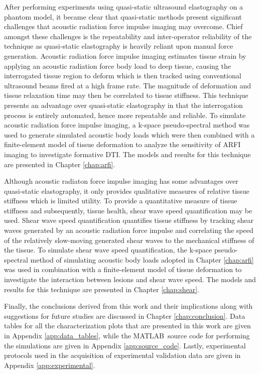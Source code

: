 		After performing experiments using quasi-static ultrasound elastography on a phantom model, it became clear that quasi-static methods present significant challenges that acoustic radiation force impulse imaging may overcome. Chief amongst these challenges is the repeatability and inter-operator reliability of the technique as quasi-static elastography is heavily reliant upon manual force generation. Acoustic radiation force impulse imaging estimates tissue strain by applying an acoustic radiation force body load to deep tissue, causing the interrogated tissue region to deform which is then tracked using conventional ultrasound beams fired at a high frame rate. The magnitude of deformation and tissue relaxation time may then be correlated to tissue stiffness. This technique presents an advantage over quasi-static elastography in that the interrogation process is entirely automated, hence more repeatable and reliable. To simulate acoustic radiation force impulse imaging, a k-space pseudo-spectral method was used to generate simulated acoustic body loads which were then combined with a finite-element model of tissue deformation to analyze the sensitivity of ARFI imaging to investigate formative DTI. The models and results for this technique are presented in Chapter \ref{chap:arfi}.

		Although acoustic radiaton force impulse imaging has some advantages over quasi-static elastography, it only provides qualitative measures of relative tissue stiffness which is limited utility. To provide a quantitative measure of tissue stiffness and subsequently, tissue health, shear wave speed quantification may be used. Shear wave speed quantification quantifies tissue stiffness by tracking shear waves generated by an acoustic radiation force impulse and correlating the speed of the relatively slow-moving generated shear waves to the mechanical stiffness of the tissue. To simulate shear wave speed quantification, the k-space pseudo-spectral method of simulating acoustic body loads adopted in Chapter \ref{chap:arfi} was used in combination with a finite-element model of tissue deformation to investigate the interaction between lesions and shear wave speed. The models and results for this technique are presented in Chapter \ref{chap:shear}.

		Finally, the conclusions derived from this work and their implications along with suggestions for future studies are discussed in Chapter \ref{chap:conclusion}. Data tables for all the characterization plots that are presented in this work are given in Appendix \ref{app:data_tables}, while the MATLAB\textsuperscript{\textregistered}\ source code for performing the simulations are given in Appendix \ref{app:source_code}. Lastly, experimental protocols used in the acquisition of experimental validation data are given in Appendix \ref{app:experimental}.

